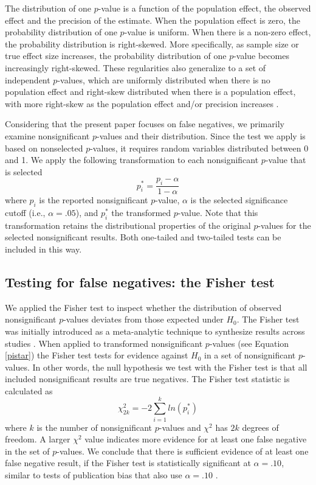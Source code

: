 \documentclass{article}
\begin{document}
The distribution of one $p$-value is a function of the population effect, the observed effect and the precision of the estimate. When the population effect is zero, the probability distribution of one $p$-value is uniform. When there is a non-zero effect, the probability distribution is right-skewed. More specifically, as sample size or true effect size increases, the probability distribution of one $p$-value becomes increasingly right-skewed. These regularities also generalize to a set of independent $p$-values, which are uniformly distributed when there is no population effect and right-skew distributed when there is a population effect, with more right-skew as the population effect and/or precision increases \cite{Fisher1925-jl}.

Considering that the present paper focuses on false negatives, we primarily examine nonsignificant $p$-values and their distribution. Since the test we apply is based on nonselected $p$-values, it requires random variables distributed between 0 and 1. We apply the following transformation to each nonsignificant $p$-value that is selected
\begin{equation}
\label{pistar}
p^*_i=\frac{p_i-\alpha}{1-\alpha}
\end{equation}
where $p_i$ is the  reported nonsignificant $p$-value, $\alpha$ is the selected significance cutoff (i.e., $\alpha=.05$), and $p^*_i$ the transformed $p$-value. Note that this transformation retains the distributional properties of the original $p$-values for the selected nonsignificant results. Both one-tailed and two-tailed tests can be included in this way.

\subsection*{Testing for false negatives: the Fisher test}

We applied the Fisher test to inspect whether the distribution of observed nonsignificant $p$-values deviates from those expected under $H_0$. The Fisher test was initially introduced as a meta-analytic technique to synthesize results across studies \cite{Fisher1925-jl,Hedges1985-dy}. When applied to transformed nonsignificant $p$-values (see Equation \ref{pistar}) the Fisher test tests for evidence against $H_0$ in a set of nonsignificant $p$-values. In other words, the null hypothesis we test with the Fisher test is that all included nonsignificant results are true negatives. The Fisher test statistic is calculated as
\begin{equation}
\label{fishertest}
\chi^2_{2k}=-2\sum\limits^k_{i=1}ln(p^*_i)
\end{equation}
where $k$ is the number of nonsignificant $p$-values and $\chi^2$ has $2k$ degrees of freedom. A larger $\chi^2$ value indicates more evidence for at least one false negative in the set of $p$-values. We conclude that there is sufficient evidence of at least one false negative result, if the Fisher test is statistically significant at $\alpha=.10$, similar to tests of publication bias that also use $\alpha=.10$ \cite{Sterne2000-wh,Ioannidis2007-hh,Francis2012-kw}.
\end{document}
